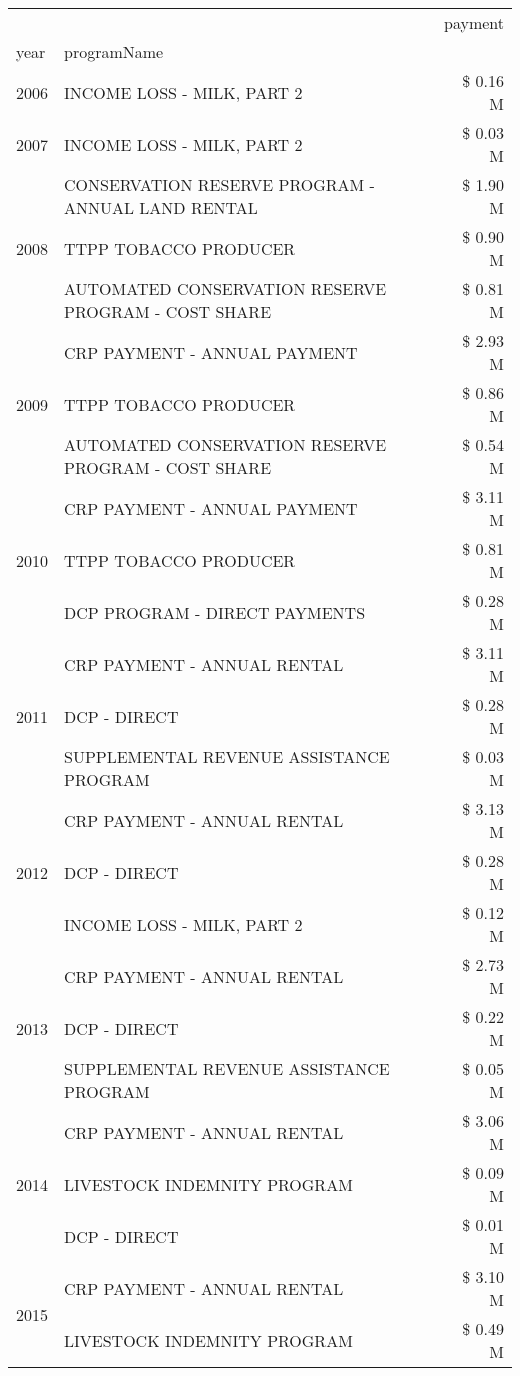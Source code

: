 \begin{tabular}{llr}
\toprule
 &  & payment \\
year & programName &  \\
\midrule
2006 & INCOME LOSS - MILK, PART 2 & \$ 0.16 M \\
\cline{1-3}
2007 & INCOME LOSS - MILK, PART 2 & \$ 0.03 M \\
\cline{1-3}
\multirow[t]{3}{*}{2008} & CONSERVATION RESERVE PROGRAM - ANNUAL LAND RENTAL & \$ 1.90 M \\
 & TTPP TOBACCO PRODUCER & \$ 0.90 M \\
 & AUTOMATED CONSERVATION RESERVE PROGRAM - COST SHARE & \$ 0.81 M \\
\cline{1-3}
\multirow[t]{3}{*}{2009} & CRP PAYMENT - ANNUAL PAYMENT & \$ 2.93 M \\
 & TTPP TOBACCO PRODUCER & \$ 0.86 M \\
 & AUTOMATED CONSERVATION RESERVE PROGRAM - COST SHARE & \$ 0.54 M \\
\cline{1-3}
\multirow[t]{3}{*}{2010} & CRP PAYMENT - ANNUAL PAYMENT & \$ 3.11 M \\
 & TTPP TOBACCO PRODUCER & \$ 0.81 M \\
 & DCP PROGRAM - DIRECT PAYMENTS & \$ 0.28 M \\
\cline{1-3}
\multirow[t]{3}{*}{2011} & CRP PAYMENT - ANNUAL RENTAL & \$ 3.11 M \\
 & DCP - DIRECT & \$ 0.28 M \\
 & SUPPLEMENTAL REVENUE ASSISTANCE PROGRAM & \$ 0.03 M \\
\cline{1-3}
\multirow[t]{3}{*}{2012} & CRP PAYMENT - ANNUAL RENTAL & \$ 3.13 M \\
 & DCP - DIRECT & \$ 0.28 M \\
 & INCOME LOSS - MILK, PART 2 & \$ 0.12 M \\
\cline{1-3}
\multirow[t]{3}{*}{2013} & CRP PAYMENT - ANNUAL RENTAL & \$ 2.73 M \\
 & DCP - DIRECT & \$ 0.22 M \\
 & SUPPLEMENTAL REVENUE ASSISTANCE PROGRAM & \$ 0.05 M \\
\cline{1-3}
\multirow[t]{3}{*}{2014} & CRP PAYMENT - ANNUAL RENTAL & \$ 3.06 M \\
 & LIVESTOCK INDEMNITY PROGRAM & \$ 0.09 M \\
 & DCP - DIRECT & \$ 0.01 M \\
\cline{1-3}
\multirow[t]{3}{*}{2015} & CRP PAYMENT - ANNUAL RENTAL & \$ 3.10 M \\
 & LIVESTOCK INDEMNITY PROGRAM & \$ 0.49 M \\

\end{tabular}
